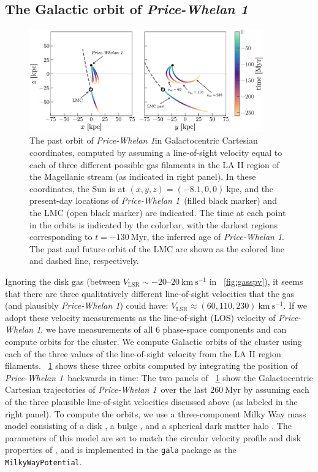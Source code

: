 \documentclass[twocolumn]{aastex62}
\newcommand{\kpc}{\textrm{kpc}}
\newcommand{\kms}{\ensuremath{\textrm{km}~\textrm{s}^{-1}}}
\newcommand{\clustername}{\textsl{Price-Whelan 1}}
\begin{document}
\subsection{The Galactic orbit of \clustername}
\label{sec:orbit}

\begin{figure}[ht!]
\centering
\includegraphics[width=0.9\textwidth]{figures/orbits.pdf}
\caption{The past orbit of \clustername in Galactocentric Cartesian coordinates, computed by assuming a line-of-sight velocity equal to each of three different possible gas  filaments in the LA II region of the Magellanic stream (as indicated in right panel).
In these coordinates, the Sun is at $(x, y, z) = (-8.1, 0, 0)~\kpc$, and the present-day locations of \clustername\ (filled black marker) and the LMC (open black marker) are indicated.
The time at each point in the orbits is indicated by the colorbar, with the darkest regions corresponding to $t = -130~\textrm{Myr}$, the inferred age of \clustername.
The past and future orbit of the LMC are shown as the colored line and dashed line, respectively.
}
\label{fig:orbits}
\end{figure}

Ignoring the disk gas (between $V_{\textrm{LSR}} \sim -20$--$20~\kms$ in \figurename~\ref{fig:gasspv}), it seems that there are three qualitatively different line-of-sight velocities that the gas (and plausibly \clustername) could have: $V_{\textrm{LSR}} \approx (60, 110, 230)~\kms$.
If we adopt these velocity measurements as the line-of-sight (LOS) velocity of \clustername, we have measurements of all 6 phase-space components and can compute orbits for the cluster.
We compute Galactic orbits of the cluster using each of the three values of the line-of-sight velocity from the LA II region filaments.
\figurename~\ref{fig:orbits} shows these three orbits computed by integrating the position of \clustername\ backwards in time:
The two panels of \figurename~\ref{fig:orbits} show the Galactocentric Cartesian trajectories of \clustername\ over the last $260~\textrm{Myr}$ by assuming each of the three plausible line-of-sight velocities discussed above (as labeled in the right panel).
To compute the orbits, we use a three-component Milky Way mass model consisting of a disk \citep{Miyamoto:1975}, a bulge \citep{Hernquist:1990}, and a spherical dark matter halo \citep{Navarro:1996}.
The parameters of this model are set to match the circular velocity profile and disk properties of \citet{Bovy:2015}, and is implemented in the \texttt{gala} package \citep{gala} as the \texttt{MilkyWayPotential}.
\end{document}
